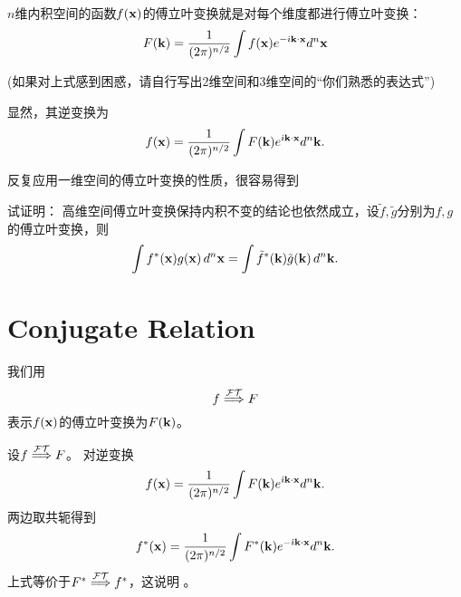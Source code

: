 \documentclass[CJK]{beamer}
\begin{document}
\begin{frame}
  \bch
  $n$维内积空间的函数$f({\mathbf{x}})$的傅立叶变换就是对每个维度都进行傅立叶变换：
  $$ F({\mathbf{k}}) = \frac{1}{(2\pi)^{n/2}}\int f({\mathbf{x}}) e^{-{\dot{\imath}} {\mathbf{k}} \cdot {\mathbf{x}}} d^n{\mathbf{x}} $$

  {\scriptsize (如果对上式感到困惑，请自行写出2维空间和3维空间的“你们熟悉的表达式”)}

  显然，其逆变换为
  $$ f({\mathbf{x}}) = \frac{1}{(2\pi)^{n/2}}\int F({\mathbf{k}}) e^{{\dot{\imath}} {\mathbf{k}} \cdot {\mathbf{x}}} d^n{\mathbf{k}}. $$
  
  \ech
\end{frame}

\begin{frame}
  \bch
  反复应用一维空间的傅立叶变换的性质，很容易得到
  
  \ech
\end{frame}


\begin{frame}
  \bch
  
  试证明：  高维空间傅立叶变换保持内积不变的结论也依然成立，设$\tilde{f}, \tilde{g}$分别为$f,g$的傅立叶变换，则
{\blue  $$\int  f^*({\mathbf{x}})g({\mathbf{x}})\,d^n{\mathbf{x}} = \int \tilde{f}^*({\mathbf{k}}) \tilde{g}({\mathbf{k}})\, d^n{\mathbf{k}} . $$}

  \ech
\end{frame}




\section{Conjugate Relation}


\begin{frame}
  \bch
  我们用
  $$f \stackrel{\mathcal{FT}}{\Longrightarrow} F $$
  表示$f({\mathbf{x}})$的傅立叶变换为$F({\mathbf{k}})$。
  \ech
\end{frame}


\begin{frame}
  \bch
  设$f \stackrel{\mathcal{FT}}{\Longrightarrow} F $。  对逆变换  
  $$ f({\mathbf{x}}) = \frac{1}{(2\pi)^{n/2}}\int F({\mathbf{k}}) e^{{\dot{\imath}} {\mathbf{k}} \cdot {\mathbf{x}}} d^n{\mathbf{k}}. $$
  两边取共轭得到
  $$ f^*({\mathbf{x}}) = \frac{1}{(2\pi)^{n/2}}\int F^*({\mathbf{k}}) e^{-{\dot{\imath}} {\mathbf{k}} \cdot {\mathbf{x}}} d^n{\mathbf{k}}. $$
  上式等价于$ F^*\stackrel{\mathcal{FT}}{\Longrightarrow} f^*$，这说明
  。
  \ech
\end{frame}
\end{document}
